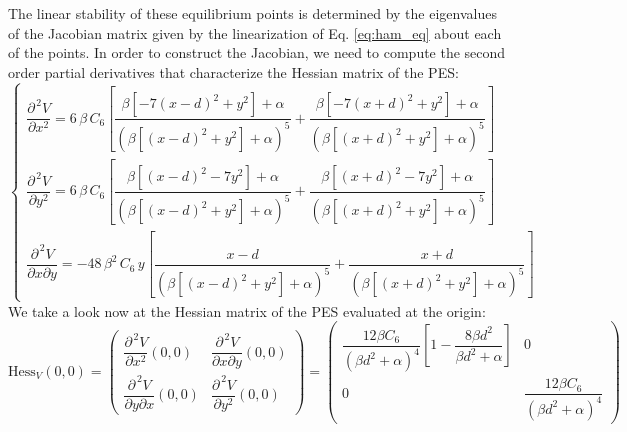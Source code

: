 \documentclass[10pt,aps,onecolumn,superscriptaddress]{revtex4-2}
\begin{document}
The linear stability of these equilibrium points is determined by the eigenvalues of the Jacobian matrix given by the linearization of Eq. \eqref{eq:ham_eq} about each of the points. In order to construct the Jacobian, we need to compute the second order partial derivatives that characterize the Hessian matrix of the PES:
\begin{equation}
\begin{cases}
\dfrac{\partial^{\,	2} V}{\partial x^2} = 6 \, \beta \, C_6 \left[\dfrac{\beta\left[-7\left(x - d\right)^2 + y^2\right] + \alpha}{\left(\beta\left[\left(x - d\right)^2 + y^2\right] + \alpha\right)^5} + \dfrac{\beta\left[-7\left(x + d\right)^2 + y^2\right] + \alpha}{\left(\beta\left[\left(x + d\right)^2 + y^2\right] + \alpha\right)^5} \right] \\[.8cm]

\dfrac{\partial^{\,	2} V}{\partial y^2} = 6 \, \beta \, C_6 \left[\dfrac{\beta\left[\left(x - d\right)^2 - 7 y^2\right] + \alpha}{\left(\beta\left[\left(x - d\right)^2 + y^2\right] + \alpha\right)^5} + \dfrac{\beta\left[\left(x + d\right)^2 - 7y^2\right] + \alpha}{\left(\beta\left[\left(x + d\right)^2 + y^2\right] + \alpha\right)^5} \right] \\[.8cm]

\dfrac{\partial^{\,	2} V}{\partial x \partial y} = - 48 \, \beta^2 \, C_6 \, y \left[\dfrac{x - d}{\left(\beta\left[\left(x - d\right)^2 + y^2\right] + \alpha\right)^5} + \dfrac{x + d}{\left(\beta\left[\left(x + d\right)^2 + y^2\right] + \alpha\right)^5}\right]
\end{cases}
\label{eq:second_pder}
\end{equation}
We take a look now at the Hessian matrix of the PES evaluated at the origin:
\begin{equation}
\text{Hess}_{V}(0,0) = \begin{pmatrix}
\dfrac{\partial^{\,	2} V}{\partial x^2}(0,0) & \dfrac{\partial^{\,	2} V}{\partial x \partial y}(0,0) \\[.4cm]
\dfrac{\partial^{\,	2} V}{\partial y \partial x}(0,0) & \dfrac{\partial^{\,	2} V}{\partial y^2}(0,0)
\end{pmatrix} = \begin{pmatrix}
\dfrac{12 \beta C_6}{\left(\beta d^2 + \alpha\right)^4} \left[1 - \dfrac{8\beta d^2}{\beta d^2 + \alpha}\right] & 0 \\[.5cm]
0 & \dfrac{12 \beta C_6}{\left(\beta d^2 + \alpha\right)^4}
\end{pmatrix}
\end{equation}
\end{document}
